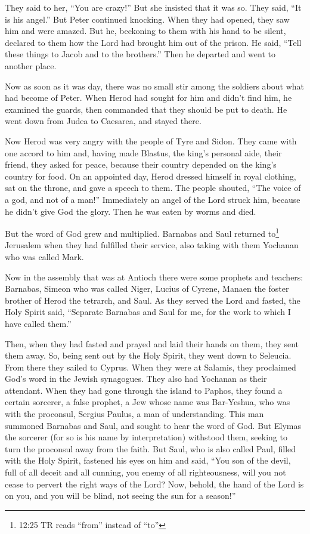 \myverse{}They said to her, “You are crazy!” But she insisted that it
was so. They said, “It is his angel.”
\myverse{}But Peter continued knocking. When they had opened, they saw him and were
amazed.
\myverse{}But he, beckoning to them with his hand to be silent, declared to them how
the Lord had brought him out of the prison. He said, “Tell these things to Jacob and to the brothers.”
Then he departed and went to another place.

\myverse{}Now as soon as it was day, there was no small stir among the
soldiers about what had become of Peter.
\myverse{}When Herod had sought for him and didn’t find him, he examined the guards,
then commanded that they should be put to death. He went down from Judea to Caesarea, and stayed there.

\myverse{}Now Herod was very angry with the people of Tyre and Sidon.
They came with one accord to him and, having made Blastus, the king’s personal aide, their friend, they
asked for peace, because their country depended on the king’s country for food.
\myverse{}On an appointed day, Herod dressed himself in royal clothing, sat on the
throne, and gave a speech to them.
\myverse{}The people shouted, “The voice of a god, and not of a man!”
\myverse{}Immediately an angel of the Lord struck him, because he didn’t give God the
glory. Then he was eaten by worms and died.

\myverse{}But the word of God grew and multiplied.
\myverse{}Barnabas and Saul returned to\footnote{12:25 TR reads “from” instead of “to”} Jerusalem when they had fulfilled their service, also
taking with them Yochanan who was called Mark.


\mychapter{} \myverse*{}Now in the assembly that was at Antioch there were some prophets
and teachers: Barnabas, Simeon who was called Niger, Lucius of Cyrene, Manaen the foster brother of Herod
the tetrarch, and Saul.
\myverse{}As they served the Lord and fasted, the Holy Spirit said, “Separate Barnabas
and Saul for me, for the work to which I have called them.”

\myverse{}Then, when they had fasted and prayed and laid their hands on
them, they sent them away.
\myverse{}So, being sent out by the Holy Spirit, they went down to Seleucia. From there
they sailed to Cyprus.
\myverse{}When they were at Salamis, they proclaimed God’s word in the Jewish synagogues.
They also had Yochanan as their attendant.
\myverse{}When they had gone through the island to Paphos, they found a certain sorcerer,
a false prophet, a Jew whose name was Bar-Yeshua,
\myverse{}who was with the proconsul, Sergius Paulus, a man of understanding. This man
summoned Barnabas and Saul, and sought to hear the word of God.
\myverse{}But Elymas the sorcerer (for so is his name by interpretation) withstood them,
seeking to turn the proconsul away from the faith.
\myverse{}But Saul, who is also called Paul, filled with the Holy Spirit, fastened his
eyes on him
\myverse{}and said, “You son of the devil, full of all deceit and all cunning, you
enemy of all righteousness, will you not cease to pervert the right ways of the Lord?
\myverse{}Now, behold, the hand of the Lord is on you, and you will be blind, not seeing
the sun for a season!”

